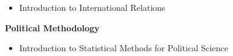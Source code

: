 \documentclass[
  16,
]{article}
\providecommand{\tightlist}{%
  \setlength{\itemsep}{0pt}\setlength{\parskip}{0pt}}\usepackage{longtable,booktabs,array}
\begin{document}
\begin{itemize}
\tightlist
\item
  Introduction to International Relations
\end{itemize}

\vspace{7pt}

\begin{large}
  \begin{multicols}{2}
    \begin{flushleft}{\bf Political Methodology}\end{flushleft}
    \begin{flushright}\end{flushright}
  \end{multicols}
\end{large}
\vspace{-0.16cm}

\begin{itemize}
\tightlist
\item
  Introduction to Statistical Methods for Political Science
\end{itemize}

\vspace{7pt}
\newpage
\end{document}

